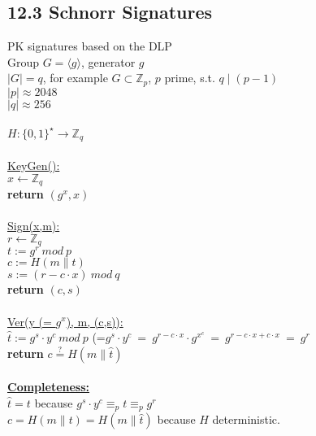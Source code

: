 \documentclass{report}
\begin{document}
	\subsection*{12.3 Schnorr Signatures}
	PK signatures based on the DLP \\
	Group $G = \langle g \rangle$, generator $g$ \\
	$\mid G \mid = q$, for example $G \subset \mathbb{Z}_p$, $p$ prime, s.t. $q \mid (p-1)$ \\
	$\mid p \mid \approx 2048$ \\
	$\mid q \mid \approx 256$ \\
	\\
	$H: \{ 0,1 \} ^{\star} \rightarrow \mathbb{Z}_q$ \\
	\\
	\underline{KeyGen():} \\
	$x \leftarrow \mathbb{Z}_q$ \\
	\textbf{return} $(g^x ,x)$ \\
	\\
	\underline{Sign(x,m):} \\
	$r \leftarrow \mathbb{Z}_q$ \\
	$t := g^r \ mod \ p$ \\
	$c := H(m \| t)$ \\
	$s := (r - c \cdot x) \ mod \ q$ \\
	\textbf{return} $(c, s)$ \\
	\\
	\underline{Ver(y (= $g^x$), m, (c,s)):} \\
	$\hat{t} := g^s \cdot y^c \ mod \ p$ (=$g^s \cdot y^c  \ = \ g^{r-c \cdot x} \cdot g^{x^c} \ = \ g^{r-c\cdot x + c \cdot x} \ = \ g^r$ \\
	\textbf{return} $c \stackrel{?}{=} H(m \| \hat{t})$ \\
	\\
	\underline{\textbf{Completeness:}} \\
	$\hat{t} = t$ because $g^s \cdot y^c \equiv_p t \equiv_p g^r$ \\
	$c = H(m\|t) = H(m\| \hat{t})$ because $H$ deterministic.
\end{document}
